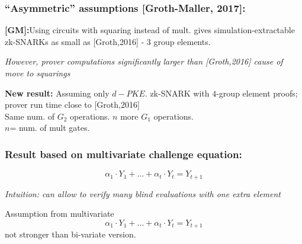 \documentclass[shadesubsections,trans,14pt,mathserif]{beamer}
\begin{document}
  \begin{frame}
 \frametitle{``Asymmetric'' assumptions [Groth-Maller, 2017]:}


\textbf{[GM]:}Using circuits with squaring instead of mult. gives  simulation-extractable zk-SNARKs as small as [Groth,2016] - 3 group elements.
 \vspace{0.3in}

\emph{However, prover computations significantly larger than [Groth,2016] cause of move to squarings}
 

 \end{frame}


 \begin{frame}
  \textbf{New result:}
  Assuming only $d-PKE$.
  zk-SNARK with $4$-group element proofs; prover run time close to [Groth,2016]\\
  
  Same num. of $G_2$ operations. $n$ more $G_1$ operations.\\
  
  $n$= num. of mult gates.
  

  
 \end{frame}

 
 
 \begin{frame}
 \frametitle{Result based on multivariate challenge equation:}
 
 \[\alpha_1 \cdot Y_1 + \ldots + \alpha_t \cdot Y_t = Y_{t+1}\]
  \vspace{0.3in}

 
   \emph{Intuition: can allow to verify many blind evaluations with one extra element}

 

 
\end{frame}  
 
 
 
 
% 
%  
%  
%  
 \begin{frame}
 
 
 
 
 
 \begin{lemma}
  Assumption from multivariate 
 \[\alpha_1 \cdot Y_1 + \ldots + \alpha_t \cdot Y_t = Y_{t+1}\]
 not stronger than bi-variate version.
 \end{lemma}

 
\end{frame}  
  
\end{document}
